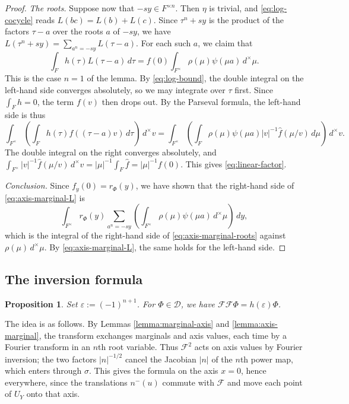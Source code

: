 \documentclass[reqno]{amsart}
\theoremstyle{plain}
\newtheorem{proposition}[theorem]{Proposition}
\theoremstyle{definition}
\theoremstyle{itplain}
\numberwithin{equation}{section}
\numberwithin{theorem}{section}
\begin{document}
\begin{proof}
  \emph{The roots.}  Suppose now that $- s y \in F^{\times n}$.  Then $\eta$ is trivial, and \eqref{eq:log-cocycle} reads $L(b c) = L(b) + L(c)$.  Since $\tau^n + s y$ is the product of the factors $\tau - a$ over the roots $a$ of $- s y$, we have $L(\tau^n + s y) = \sum_{a^n = - s y} L(\tau - a)$.  For each such $a$, we claim that
  \begin{equation}\label{eq:linear-factor}
    \int_F h(\tau) L(\tau - a) \, d \tau = f(0) \int_{F^\times} \rho(\mu) \psi(\mu a) \, d^\times \mu.
  \end{equation}
  This is the case $n = 1$ of the lemma.  By \eqref{eq:log-bound}, the double integral on the left-hand side converges absolutely, so we may integrate over $\tau$ first.  Since $\int_F h = 0$, the term $f(v)$ then drops out.  By the Parseval formula, the left-hand side is thus
  \begin{equation*}
    \int_{F^\times} \left( \int_F h(\tau) f((\tau - a) v) \, d \tau \right) \, d^\times v
    =
    \int_{F^\times} \left( \int_F \rho(\mu) \psi(\mu a) \lvert v \rvert^{-1} \hat{f}(\mu / v) \, d \mu \right) \, d^\times v.
  \end{equation*}
  The double integral on the right converges absolutely, and $\int_{F^\times} \lvert v \rvert^{-1} \hat{f}(\mu / v) \, d^\times v = \lvert \mu \rvert^{-1} \int_F \hat{f} = \lvert \mu \rvert^{-1} f(0)$.  This gives \eqref{eq:linear-factor}.

  \emph{Conclusion.}  Since $f_y(0) = r_\Phi(y)$, we have shown that the right-hand side of \eqref{eq:axis-marginal-L} is
  \begin{equation*}
    \int_{F^\times} r_\Phi(y) \sum_{a^n = - s y} \left( \int_{F^\times} \rho(\mu) \psi(\mu a) \, d^\times \mu \right) \, d y,
  \end{equation*}
  which is the integral of the right-hand side of \eqref{eq:axis-marginal-roots} against $\rho(\mu) \, d^\times \mu$.  By \eqref{eq:axis-marginal-L}, the same holds for the left-hand side.
\end{proof}

\subsection{The inversion formula}\label{sec:inversion-formula}
\begin{proposition}\label{proposition:inversion}
  Set $\varepsilon := (-1)^{n+1}$.  For $\Phi \in \mathcal{D}$, we have $\mathcal{F} \mathcal{F} \Phi = h(\varepsilon) \Phi$.
\end{proposition}
The idea is as follows.  By Lemmas \ref{lemma:marginal-axis} and \ref{lemma:axis-marginal}, the transform exchanges marginals and axis values, each time by a Fourier transform in an $n$th root variable.  Thus $\mathcal{F}^2$ acts on axis values by Fourier inversion; the two factors $\lvert n \rvert^{-1/2}$ cancel the Jacobian $\lvert n \rvert$ of the $n$th power map, which enters through $\sigma$.  This gives the formula on the axis $x = 0$, hence everywhere, since the translations $n^-(u)$ commute with $\mathcal{F}$ and move each point of $U_Y$ onto that axis.
\end{document}
